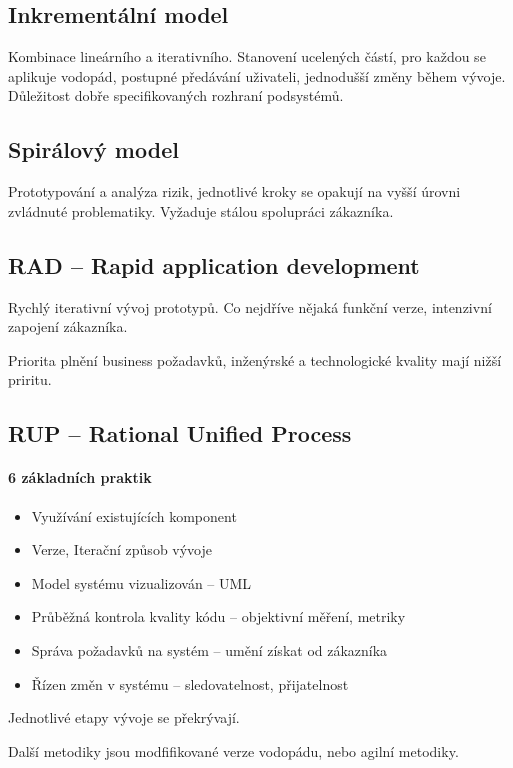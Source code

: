 \documentclass[a4paper, 11pt]{report}
\begin{document}
\subsection{Inkrementální model}
Kombinace lineárního a iterativního. Stanovení ucelených částí, pro každou se aplikuje vodopád, postupné předávání uživateli, jednodušší změny během vývoje. Důležitost dobře specifikovaných rozhraní podsystémů.

\subsection{Spirálový model}
Prototypování a analýza rizik, jednotlivé kroky se opakují na vyšší úrovni zvládnuté problematiky. Vyžaduje stálou spolupráci zákazníka.

\subsection{RAD -- Rapid application development}

Rychlý iterativní vývoj prototypů. Co nejdříve nějaká funkční verze, intenzivní zapojení zákazníka.

Priorita plnění business požadavků, inženýrské a technologické kvality mají nižší priritu.

\subsection{RUP -- Rational Unified Process}

\paragraph{6 základních praktik}
\begin{itemize}
	\item Využívání existujících komponent
	\item Verze, Iterační způsob vývoje
	\item Model systému vizualizován -- UML
	\item Průběžná kontrola kvality kódu -- objektivní měření, metriky
	\item Správa požadavků na systém -- umění získat od zákazníka
	\item Řízen změn v systému -- sledovatelnost, přijatelnost
\end{itemize}

Jednotlivé etapy vývoje se překrývají.

Další metodiky jsou modfifikované verze vodopádu, nebo agilní metodiky.
\end{document}
